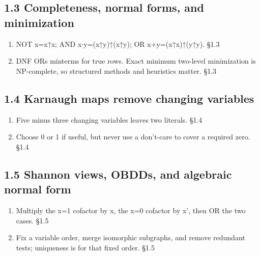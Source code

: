 \documentclass[11pt]{article}
\begin{document}
\begin{keepsection}\subsection{1.3 Completeness, normal forms, and minimization}

\begin{enumerate}
\item NOT x=x↑x; AND x\ensuremath{\cdot}y=(x↑y)↑(x↑y); OR x+y=(x↑x)↑(y↑y). \hfill{\small\color{FAUblue}§1.3}
\item DNF ORs minterms for true rows. Exact minimum two-level minimization is NP-complete, so structured methods and heuristics matter. \hfill{\small\color{FAUblue}§1.3}
\end{enumerate}

\end{keepsection}
\begin{keepsection}\subsection{1.4 Karnaugh maps remove changing variables}

\begin{enumerate}
\item Five minus three changing variables leaves two literals. \hfill{\small\color{FAUblue}§1.4}
\item Choose 0 or 1 if useful, but never use a don’t-care to cover a required zero. \hfill{\small\color{FAUblue}§1.4}
\end{enumerate}

\end{keepsection}
\begin{keepsection}\subsection{1.5 Shannon views, OBDDs, and algebraic normal form}

\begin{enumerate}
\item Multiply the x=1 cofactor by x, the x=0 cofactor by x', then OR the two cases. \hfill{\small\color{FAUblue}§1.5}
\item Fix a variable order, merge isomorphic subgraphs, and remove redundant tests; uniqueness is for that fixed order. \hfill{\small\color{FAUblue}§1.5}
\end{enumerate}

\end{keepsection}
\end{document}
